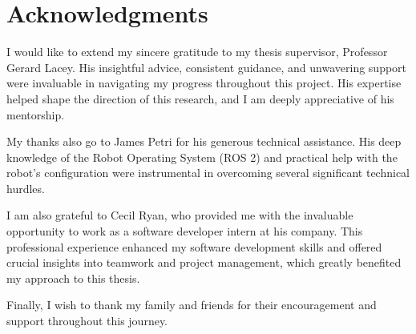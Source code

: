 \chapter*{Acknowledgments}
I would like to extend my sincere gratitude to my thesis supervisor, Professor Gerard Lacey. His insightful advice, consistent guidance, and unwavering support were invaluable in navigating my progress throughout this project. His expertise helped shape the direction of this research, and I am deeply appreciative of his mentorship.

My thanks also go to James Petri for his generous technical assistance. His deep knowledge of the Robot Operating System (ROS 2) and practical help with the robot's configuration were instrumental in overcoming several significant technical hurdles.

I am also grateful to Cecil Ryan, who provided me with the invaluable opportunity to work as a software developer intern at his company. This professional experience enhanced my software development skills and offered crucial insights into teamwork and project management, which greatly benefited my approach to this thesis.

Finally, I wish to thank my family and friends for their encouragement and support throughout this journey.
